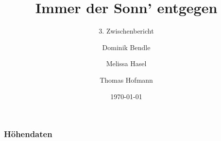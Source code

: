 \documentclass[aspectratio=43]{beamer}
\title{Immer der Sonn' entgegen}
\subtitle{3. Zwischenbericht}
\author{Dominik Bendle \and Melissa Hasel \and Thomas Hofmann}
\date{\today}
\institute{TU Kaiserslautern}
\begin{document}
\begin{frame}[plain]


\end{frame}

\begin{frame}
    \frametitle{Höhendaten}
\end{frame}
\end{document}
